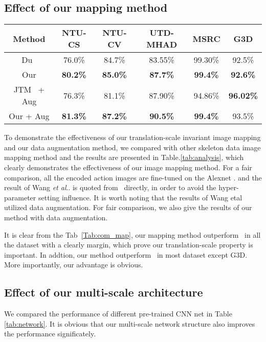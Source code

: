 \documentclass[10pt,journal]{IEEEtran}
\makeatletter
\DeclareRobustCommand\onedot{\futurelet\@let@token\@onedot}
\def\@onedot{\ifx\@let@token.\else.\null\fi\xspace}
\def\etal{\emph{et al}\onedot}
\makeatother
\begin{document}
\subsection{Effect of our mapping method}

\begin{table*}[!htb]
\begin{center}
\caption{Performance comparison of different mapping methods on the popular benchmard dataset } \label{tab:analysis}
\begin{tabular}{  c  c  c  c  c  c}
\hline
Method           &NTU-CS &NTU-CV &UTD-MHAD &MSRC &G3D \\
\hline
Du~\cite{Yong2015Skeleton} &76.0\% &84.7\% &83.55\% &99.30\% &{92.5\%}\\
Our     & \bf{80.2}\% &\bf{85.0}\% &\bf{87.7}\% &\bf{99.4}\% &\bf{92.6}\%\\
\hline
JTM~\cite{Wang2016Action} + Aug  &76.3\% &81.1\% &87.90\% &{94.86}\% &\bf{96.02}\%\\
Our + Aug   & \bf{81.3}\% &\bf{87.2}\% &\bf{90.5\%} &\bf{99.4\%} & 93.5\%\\
\hline
\end{tabular}
\end{center}
\label{Tab:com_map}
\end{table*}

To demonstrate the effectiveness of our translation-scale invariant image mapping and our data augmentation method, we compared with other skeleton data image mapping method and the results are presented in Table.\ref{tab:analysis}, which clearly demonstrates the effectiveness of our image mapping method. For a fair comparison, all the encoded action images are fine-tuned on the Alexnet \cite{krizhevsky2012imagenet}. and the result of Wang \etal is quoted from~\cite{Wang2016Action} directly, in order to avoid the hyper-parameter setting influence. It is worth noting that the results of Wang 
etal~\cite{Wang2016Action} utilized data augmentation. For fair comparison, we also give the results of our method with data augmentation.

It is clear from the Tab~\ref{Tab:com_map}, our mapping method outperform~\cite{Yong2015Skeleton} in all the dataset with a clearly margin, which prove our translation-scale property is important. In addtion, our method outperform~\cite{Wang2016Action} in most dataset except G3D. More importantly, our advantage is obvious.

\subsection{Effect of our multi-scale architecture}
We compared the performance of different pre-trained CNN net in Table \ref{tab:network}. It is obvious that our multi-scale network structure also improves the performance significately.
\end{document}
